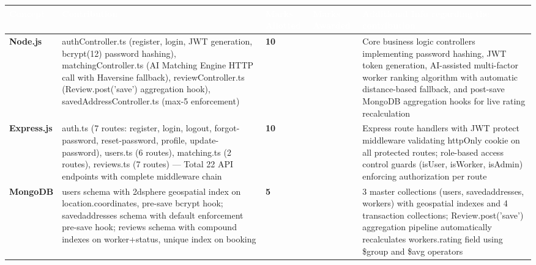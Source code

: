 \documentclass[12pt,a4paper]{article}
\begin{document}
\begin{table}[h!]
\centering
\scriptsize
\renewcommand{\arraystretch}{1.5}
\begin{tabular}{|p{1.8cm}|p{4.5cm}|>{\centering\arraybackslash}p{1.5cm}|>{\centering\arraybackslash}p{1.5cm}|p{5.7cm}|}
\hline
\rowcolor{headerblue}
\textcolor{white}{\textbf{Concept}} & 
\textcolor{white}{\textbf{Contribution}} & 
\textcolor{white}{\textbf{Marks Allotted}} & 
\textcolor{white}{\textbf{Marks Awarded}} & 
\textcolor{white}{\textbf{Additional Info regarding the contribution}} \\
\hline
\rowcolor{lightgray}
\textbf{Node.js} & 
authController.ts (register, login, JWT generation, bcrypt(12) password hashing), matchingController.ts (AI Matching Engine HTTP call with Haversine fallback), reviewController.ts (Review.post('save') aggregation hook), savedAddressController.ts (max-5 enforcement)
& \textbf{10} & & 
Core business logic controllers implementing password hashing, JWT token generation, AI-assisted multi-factor worker ranking algorithm with automatic distance-based fallback, and post-save MongoDB aggregation hooks for live rating recalculation \\
\hline

\textbf{Express.js} & 
auth.ts (7 routes: register, login, logout, forgot-password, reset-password, profile, update-password), users.ts (6 routes), matching.ts (2 routes), reviews.ts (7 routes) — Total 22 API endpoints with complete middleware chain
& \textbf{10} & & 
Express route handlers with JWT protect middleware validating httpOnly cookie on all protected routes; role-based access control guards (isUser, isWorker, isAdmin) enforcing authorization per route \\
\hline
\rowcolor{lightgray}
\textbf{MongoDB} & 
users schema with 2dsphere geospatial index on location.coordinates, pre-save bcrypt hook; savedaddresses schema with default enforcement pre-save hook; reviews schema with compound indexes on worker+status, unique index on booking
& \textbf{5} & & 
3 master collections (users, savedaddresses, workers) with geospatial indexes and 4 transaction collections; Review.post('save') aggregation pipeline automatically recalculates workers.rating field using \$group and \$avg operators \\
\hline


\end{tabular}
\end{table}
\end{document}
